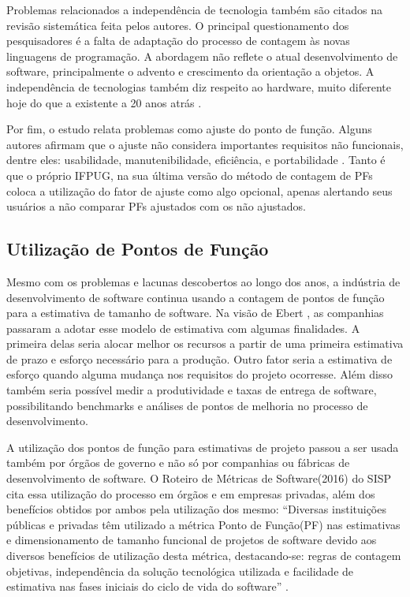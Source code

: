 Problemas relacionados a independência de tecnologia também são citados na revisão sistemática feita pelos autores. O principal questionamento dos pesquisadores é a falta de adaptação do processo de contagem às novas linguagens de programação. A abordagem não reflete o atual desenvolvimento de software, principalmente o advento e crescimento da orientação a objetos. A independência de tecnologias também diz respeito ao hardware, muito diferente hoje do que a existente a 20 anos atrás \cite{Marcos:2015}.

Por fim, o estudo relata problemas como ajuste do ponto de função. Alguns autores afirmam que o ajuste não considera  importantes requisitos não funcionais, dentre eles: usabilidade, manutenibilidade, eficiência, e portabilidade \cite{Marcos:2015}.  Tanto é que o próprio IFPUG, na sua última versão do método de contagem de PFs coloca a utilização do fator de ajuste como algo opcional, apenas alertando seus usuários a não comparar PFs ajustados com os não ajustados.

\subsection{Utilização de Pontos de Função}

Mesmo com os problemas e lacunas descobertos ao longo dos anos, a indústria de desenvolvimento de software continua usando a contagem de pontos de função para a estimativa de tamanho de software. Na visão de Ebert \cite{Ebert:2014}, as companhias passaram a adotar esse modelo de estimativa com algumas finalidades. A primeira delas seria alocar melhor os recursos a partir de uma primeira estimativa de prazo e esforço necessário para a produção. Outro fator seria a estimativa de esforço quando alguma mudança nos requisitos do projeto ocorresse. Além disso também seria possível medir a produtividade e taxas de entrega de software, possibilitando benchmarks  e análises de pontos de melhoria no processo de desenvolvimento.

A utilização dos pontos de função para estimativas de projeto passou a ser usada também por órgãos de governo e não só por companhias ou fábricas de desenvolvimento de software. O Roteiro de Métricas de Software(2016) do SISP cita essa utilização do processo em órgãos e em empresas privadas, além dos benefícios obtidos por ambos pela utilização dos mesmo:  “Diversas instituições públicas e privadas têm utilizado a métrica Ponto de Função(PF) nas estimativas e dimensionamento de tamanho funcional de projetos de software devido aos diversos benefícios de utilização desta métrica, destacando-se: regras de contagem objetivas, independência da solução tecnológica utilizada e facilidade de estimativa nas fases iniciais do ciclo de vida do software” \cite{SISP:2016}. 
